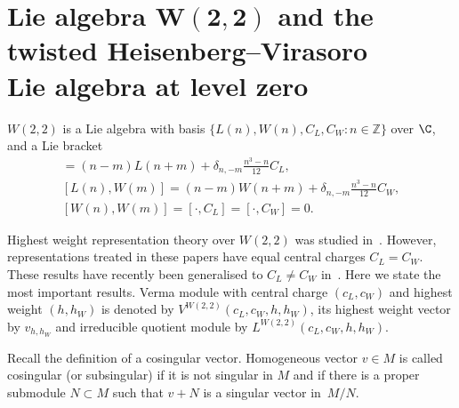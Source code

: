 \section[Lie algebra $W(2,2)$ and the twisted Heisenberg--Virasoro Lie algebra at level zero]{Lie algebra $\boldsymbol{W(2,2)}$ and the twisted Heisenberg--Virasoro\\ Lie algebra at level zero}\label{rep-th-review}
$W(2,2)$ is a Lie algebra with basis $\{L(n), W(n),C_{L},C_{W}\colon n\in\mathbb{Z\}}$ over $\C$, and a Lie bracket
\begin{gather*}
[ L(n) ,L(m) ] =(n-m) L(n+m) +\delta_{n,-m}\frac{n^{3}-n}{12}C_{L}, \\ %
[ L(n) ,W(m) ] =(n-m)W(n+m) +\delta_{n,-m}\frac{n^{3}-n}{12}C_{W}, \\
[ W(n) ,W(m) ] =[ \cdot,C_{L}] =[ \cdot,C_{W}] =0.
\end{gather*}

Highest weight representation theory over $W(2,2)$ was studied in~\cite{JP,R-JMP}. However, representations treated in these papers have
equal central charges $C_{L}=C_{W}$. These results have recently been generalised to $C_{L}\neq C_{W}$ in~\cite{JZ}. Here we state the most important results. Verma module with central charge $(c_{L},c_{W}) $ and highest weight $(h,h_{W}) $ is denoted by $V^{W(2,2)}( c_{L},c_{W},h,h_{W})$, its highest weight vector
by $v_{h,h_W}$ and irreducible quotient module by $L^{W(2,2)} (c_{L},c_{W},h,h_{W})$.

Recall the def\/inition of a cosingular vector. Homogeneous vector $v\in M$ is called cosingular (or subsingular) if it is not singular in $M$ and if there
is a proper submodule $N \subset M$ such that $v+N$ is a singular vector in~$M/N$.

